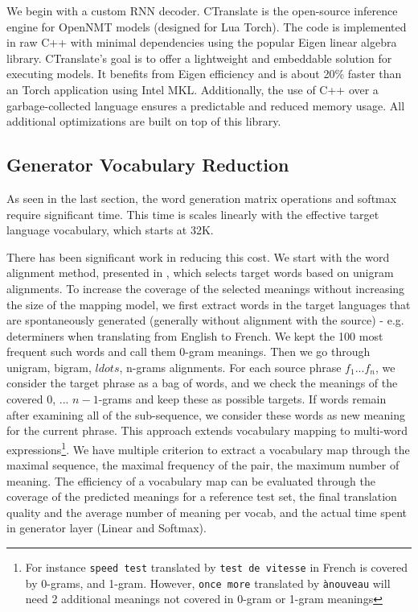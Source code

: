 \documentclass[11pt,a4paper]{article}
\begin{document}
We begin with a custom RNN decoder.  CTranslate is the open-source
inference engine for OpenNMT models (designed for Lua Torch).  The
code is implemented in raw C++ with minimal dependencies using the
popular Eigen linear algebra library. CTranslate's goal is to offer a
lightweight and embeddable solution for executing models. It benefits
from Eigen efficiency and is about 20\% faster than an Torch
application using Intel MKL. Additionally, the use of C++ over a
garbage-collected language ensures a predictable and reduced memory
usage. All additional optimizations are built on top of this library.


\subsection{Generator Vocabulary Reduction}

As seen in the last section, the word generation matrix operations
and softmax require significant time. This time is scales linearly
with the effective target language vocabulary, which starts at 32K.

There has been significant work in reducing this cost. We start with
the word alignment method, presented in ,
which selects target words based on unigram alignments. To increase
the coverage of the selected meanings without increasing the size of
the mapping model, we first extract words in the target languages that
are spontaneously generated (generally without alignment with the
source) - e.g. determiners when translating from English to French. We
kept the 100 most frequent such words and call them 0-gram
meanings. Then we go through unigram, bigram, $ldots$, n-grams
alignments. For each source phrase $f_1 ... f_n$, we consider the
target phrase as a bag of words, and we check the meanings of the
covered $0$, ... $n-1$-grams and keep these as possible targets. If
words remain after examining all of the sub-sequence, we consider
these words as new meaning for the current phrase. This approach
extends vocabulary mapping to multi-word expressions\footnote{For
  instance {\tt speed test} translated by {\tt test de vitesse} in
  French is covered by 0-grams, and 1-gram. However, {\tt once more}
  translated by {\tt ànouveau} will need 2 additional meanings not
  covered in 0-gram or 1-gram meanings}.
We have multiple criterion to extract a vocabulary map through the
maximal sequence, the maximal frequency of the pair, the
maximum number of meaning. The efficiency of a vocabulary map can
be evaluated through the coverage of the predicted meanings for a
reference test set, the final translation quality and the average
number of meaning per vocab, and the actual time spent in generator
layer (Linear and Softmax).
\end{document}
